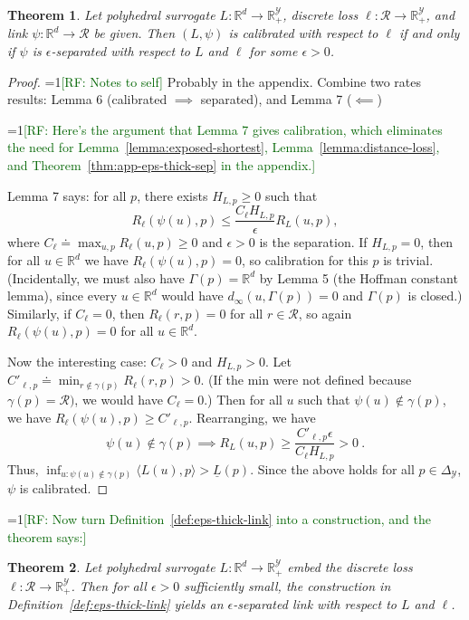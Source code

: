\documentclass[11pt]{article}
\newcommand{\Comments}{1}
\newcommand{\mynote}[2]{\ifnum\Comments=1\textcolor{#1}{#2}\fi}
\newcommand{\raf}[1]{\mynote{darkgreen}{[RF: #1]}}
\newcommand{\reals}{\mathbb{R}}
\newcommand{\simplex}{\Delta_\Y}
\newcommand{\R}{\mathcal{R}}
\newcommand{\Y}{\mathcal{Y}}
\newcommand{\risk}[1]{\underline{#1}}
\newcommand{\inprod}[2]{\langle #1, #2 \rangle}%
\newtheorem{theorem}{Theorem}
\begin{document}
\begin{theorem}
  Let polyhedral surrogate $L:\reals^d \to \reals^\Y_+$, discrete loss $\ell:\R\to\reals^\Y_+$, and link $\psi:\reals^d\to\R$ be given.
  Then $(L,\psi)$ is calibrated with respect to $\ell$ if and only if
  $\psi$ is $\epsilon$-separated with respect to $L$ and $\ell$ for some
  $\epsilon>0$.
\end{theorem}
\begin{proof}
  \raf{Notes to self}
  Probably in the appendix.
  Combine two rates results: Lemma 6 (calibrated $\implies$ separated), and Lemma 7 ($\impliedby$)

  \raf{Here's the argument that Lemma 7 gives calibration, which eliminates the need for Lemma~\ref{lemma:exposed-shortest}, Lemma~\ref{lemma:distance-loss}, and Theorem~\ref{thm:app-eps-thick-sep} in the appendix.}
  
  Lemma 7 says: for all $p$, there exists $H_{L,p} \geq 0$ such that
  \[ R_{\ell}(\psi(u),p) \leq \frac{C_{\ell} H_{L,p}}{\epsilon} R_L(u,p) , \]
  where $C_\ell \doteq \max_{u,p} R_\ell(u,p) \geq 0$ and $\epsilon > 0$ is the separation.
  If $H_{L,p} = 0$, then for all $u\in\reals^d$ we have $R_\ell(\psi(u),p) = 0$, so calibration for this $p$ is trivial.
  (Incidentally, we must also have $\Gamma(p) = \reals^d$ by Lemma 5 (the Hoffman constant lemma), since every $u\in\reals^d$ would have $d_\infty(u,\Gamma(p)) = 0$ and $\Gamma(p)$ is closed.)
  Similarly, if $C_\ell = 0$, then $R_\ell(r,p) = 0$ for all $r\in\R$, so again $R_\ell(\psi(u),p) = 0$ for all $u\in\reals^d$.

  Now the interesting case: $C_\ell > 0$ and $H_{L,p} > 0$.
  Let $C'_{\ell,p} \doteq \min_{r \notin \gamma(p)} R_\ell(r,p) > 0$.
  (If the min were not defined because $\gamma(p) = \R)$, we would have $C_\ell = 0$.)
  Then for all $u$ such that $\psi(u) \notin \gamma(p)$, we have $R_\ell(\psi(u),p) \geq C'_{\ell,p}$.
  Rearranging, we have
  \[ \psi(u) \notin \gamma(p) \implies R_L(u,p) \geq \frac{C'_{\ell,p} \epsilon}{C_\ell H_{L,p}} > 0~.\]
  Thus, $\inf_{u : \psi(u) \notin \gamma(p)} \inprod{L(u)}{p} > \risk{L}(p)$.
  Since the above holds for all $p\in\simplex$, $\psi$ is calibrated.
\end{proof}

\raf{Now turn Definition~\ref{def:eps-thick-link} into a construction, and the theorem says:}

\begin{theorem}
  Let polyhedral surrogate $L:\reals^d \to \reals^\Y_+$ embed the discrete loss $\ell:\R\to\reals^\Y_+$.
  Then for all $\epsilon>0$ sufficiently small, the construction in Definition~\ref{def:eps-thick-link} yields an $\epsilon$-separated link with respect to $L$ and $\ell$.
\end{theorem}
\end{document}
